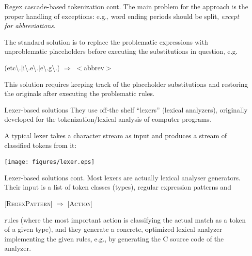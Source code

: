 \documentclass[style=upen, size=14pt]{powerdot}
\theoremstyle{definition}
\begin{document}
\begin{slide}[toc=]{Regex cascade-based tokenization cont.}
  The main problem for the approach is the proper handling of exceptions: e.g.,
  word ending periods should be split, \emph{except for abbreviations}.\bigskip

  The standard solution is to replace the problematic expressions with
  unproblematic placeholders before executing the substitutions in question, e.g.\smallskip

  \begin{center}
    (etc\textbackslash.$\vert$i\textbackslash.e\textbackslash.$\vert$e\textbackslash.g\textbackslash.)
    $\Rightarrow$ $<$abbrev$>$
  \end{center}\smallskip
  
  This solution requires keeping track of the placeholder substitutions and
  restoring the originals after executing the problematic rules.
\end{slide}

\begin{slide}[toc=Lexers]{Lexer-based solutions}
  They use off-the shelf ``lexers'' (lexical analyzers), originally developed
  for the tokenization/lexical analysis of computer programs.

  A typical lexer takes a character stream as input and produces a stream of
  classified tokens from it:

  \begin{center}
    \texttt{[image: figures/lexer.eps]}
  \end{center}
\end{slide}

\begin{slide}[toc=]{Lexer-based solutions cont.}
  Most lexers are actually lexical analyser generators. Their input is a list of
  token classes (types), regular expression patterns and\smallskip

  \begin{center}
    [\textsc{RegexPattern}] $\Rightarrow$ [\textsc{Action}]\smallskip
  \end{center}

rules (where the most important action is classifying the actual match as a
token of a given type), and they generate a concrete, optimized lexical analyzer
implementing the given rules, e.g., by generating the C source code of the
analyzer.
\end{slide}
\end{document}
